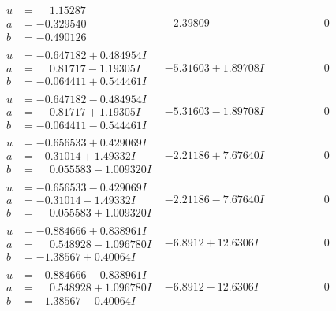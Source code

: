 \documentclass[1p]{elsarticle_modified}
\theoremstyle{definition}
\begin{document}
$$\begin{array}{c|c|c}
\begin{aligned}
u &= \phantom{-}1.15287\phantom{ +0.000000I} \\
a &= -0.329540\phantom{ +0.000000I} \\
b &= -0.490126\phantom{ +0.000000I}\end{aligned}
 & -2.39809\phantom{ +0.000000I} & \phantom{-0.000000 } 0 \\ \hline\begin{aligned}
u &= -0.647182 + 0.484954 I \\
a &= \phantom{-}0.81717 - 1.19305 I \\
b &= -0.064411 + 0.544461 I\end{aligned}
 & -5.31603 + 1.89708 I & \phantom{-0.000000 } 0 \\ \hline\begin{aligned}
u &= -0.647182 - 0.484954 I \\
a &= \phantom{-}0.81717 + 1.19305 I \\
b &= -0.064411 - 0.544461 I\end{aligned}
 & -5.31603 - 1.89708 I & \phantom{-0.000000 } 0 \\ \hline\begin{aligned}
u &= -0.656533 + 0.429069 I \\
a &= -0.31014 + 1.49332 I \\
b &= \phantom{-}0.055583 - 1.009320 I\end{aligned}
 & -2.21186 + 7.67640 I & \phantom{-0.000000 } 0 \\ \hline\begin{aligned}
u &= -0.656533 - 0.429069 I \\
a &= -0.31014 - 1.49332 I \\
b &= \phantom{-}0.055583 + 1.009320 I\end{aligned}
 & -2.21186 - 7.67640 I & \phantom{-0.000000 } 0 \\ \hline\begin{aligned}
u &= -0.884666 + 0.838961 I \\
a &= \phantom{-}0.548928 - 1.096780 I \\
b &= -1.38567 + 0.40064 I\end{aligned}
 & -6.8912 + 12.6306 I & \phantom{-0.000000 } 0 \\ \hline\begin{aligned}
u &= -0.884666 - 0.838961 I \\
a &= \phantom{-}0.548928 + 1.096780 I \\
b &= -1.38567 - 0.40064 I\end{aligned}
 & -6.8912 - 12.6306 I & \phantom{-0.000000 } 0 \\ \hline\begin{aligned}

\end{aligned}
\end{array}$$
\end{document}
